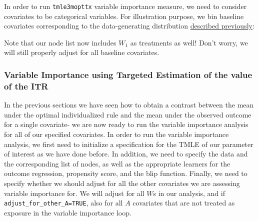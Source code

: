 \documentclass[12pt, krantz2,]{krantz}
\newenvironment{Shaded}{\begin{snugshade}}{\end{snugshade}}
\newcommand{\CommentTok}[1]{\textcolor[rgb]{0.37,0.37,0.37}{\textit{#1}}}
\newcommand{\DataTypeTok}[1]{\textcolor[rgb]{0.27,0.27,0.27}{#1}}
\newcommand{\DecValTok}[1]{\textcolor[rgb]{0.06,0.06,0.06}{#1}}
\newcommand{\KeywordTok}[1]{\textcolor[rgb]{0.27,0.27,0.27}{\textbf{#1}}}
\newcommand{\NormalTok}[1]{#1}
\newcommand{\OperatorTok}[1]{\textcolor[rgb]{0.43,0.43,0.43}{\textbf{#1}}}
\newcommand{\StringTok}[1]{\textcolor[rgb]{0.5,0.5,0.5}{#1}}
\theoremstyle{definition}
\theoremstyle{definition}
\theoremstyle{definition}
\newcommand{\1}{\mathbbm{1}}
\begin{document}
In order to run \texttt{tmle3mopttx} variable importance measure, we need to consider
covariates to be categorical variables. For illustration purpose, we bin
baseline covariates corresponding to the data-generating distribution
\protect\hyperlink{oit-eval}{described previously}:

\begin{Shaded}
\end{Shaded}

Note that our node list now includes \(W_1\) as treatments as well! Don't worry,
we will still properly adjust for all baseline covariates.

\hypertarget{variable-importance-using-targeted-estimation-of-the-value-of-the-itr}{%
\subsubsection{Variable Importance using Targeted Estimation of the value of the ITR}\label{variable-importance-using-targeted-estimation-of-the-value-of-the-itr}}

In the previous sections we have seen how to obtain a contrast between the mean
under the optimal individualized rule and the mean under the observed outcome
for a single covariate- we are now ready to run the variable importance analysis
for all of our specified covariates. In order to run the variable importance
analysis, we first need to initialize a specification for the TMLE of our
parameter of interest as we have done before. In addition, we need to specify
the data and the corresponding list of nodes, as well as the appropriate
learners for the outcome regression, propensity score, and the blip function.
Finally, we need to specify whether we should adjust for all the other
covariates we are assessing variable importance for. We will adjust for all \(W\)s
in our analysis, and if \texttt{adjust\_for\_other\_A=TRUE}, also for all \(A\) covariates
that are not treated as exposure in the variable importance loop.
\end{document}
